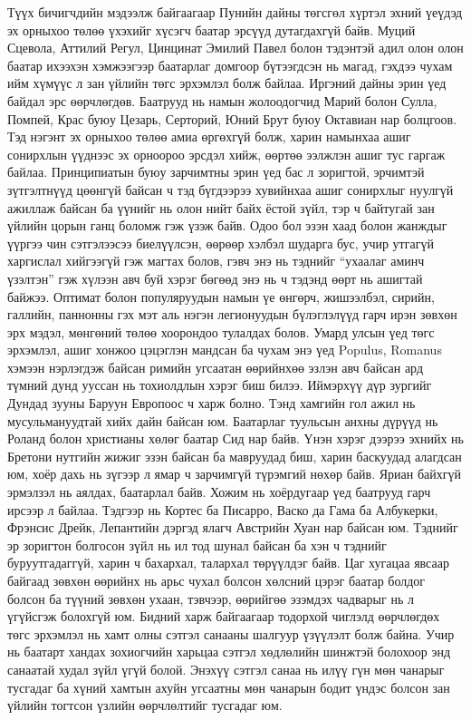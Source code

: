 Түүх бичигчдийн мэдээлж байгаагаар Пунийн дайны төгсгөл хүртэл эхний үеүдэд эх орныхоо төлөө үхэхийг хүсэгч баатар эрсүүд дутагдахгүй байв. Муций Сцевола, Аттилий Регул, Цинцинат Эмилий Павел болон тэдэнтэй адил олон олон баатар ихээхэн хэмжээгээр баатарлаг домгоор бүтээгдсэн нь магад, гэхдээ чухам ийм хүмүүс л зан үйлийн төгс эрхэмлэл болж байлаа. Иргэний дайны эрин үед байдал эрс өөрчлөгдөв. Баатрууд нь намын жолоодогчид Марий болон Сулла, Помпей, Крас буюу Цезарь, Серторий, Юний Брут буюу Октавиан нар болцгоов. Тэд нэгэнт эх орныхоо төлөө амиа өргөхгүй болж, харин намынхаа ашиг сонирхлын үүднээс эх орноороо эрсдэл хийж, өөртөө ээлжлэн ашиг тус гаргаж байлаа. Принципиатын буюу зарчимтны эрин үед бас л зоригтой, эрчимтэй зүтгэлтнүүд цөөнгүй байсан ч тэд бүгдээрээ хувийнхаа ашиг сонирхлыг нуулгүй ажиллаж байсан ба үүнийг нь олон нийт байх ёстой зүйл, тэр ч байтугай зан үйлийн цорын ганц боломж гэж үзэж байв. Одоо бол эзэн хаад болон жанждыг үүргээ чин сэтгэлээсээ биелүүлсэн, өөрөөр хэлбэл шударга бус, учир утгагүй харгислал хийгээгүй гэж магтах болов, гэвч энэ нь тэднийг “ухаалаг аминч үзэлтэн” гэж хүлээн авч буй хэрэг бөгөөд энэ нь ч тэдэнд өөрт нь ашигтай байжээ. Оптимат болон популяруудын намын үе өнгөрч, жишээлбэл, сирийн, галлийн, паннонны гэх мэт аль нэгэн легионуудын бүлэглэлүүд гарч ирэн зөвхөн эрх мэдэл, мөнгөний төлөө хоорондоо тулалдах болов. Умард улсын үед төгс эрхэмлэл, ашиг хонжоо цэцэглэн мандсан ба чухам энэ үед Populus, Romanus хэмээн нэрлэгдэж байсан римийн угсаатан өөрийнхөө эзлэн авч байсан ард түмний дунд ууссан нь тохиолдлын хэрэг биш билээ.
Иймэрхүү дүр зургийг Дундад зууны Баруун Европоос ч харж болно. Тэнд хамгийн гол ажил нь мусульмануудтай хийх дайн байсан юм. Баатарлаг туульсын анхны дүрүүд нь Роланд болон христианы хөлөг баатар Сид нар байв. Үнэн хэрэг дээрээ эхнийх нь Бретони нутгийн жижиг эзэн байсан ба мавруудад биш, харин баскуудад алагдсан юм, хоёр дахь нь зүгээр л ямар ч зарчимгүй түрэмгий нөхөр байв. Яриан байхгүй эрмэлзэл нь аялдах, баатарлал байв. Хожим нь хоёрдугаар үед баатрууд гарч ирсээр л байлаа. Тэдгээр нь Кортес ба Писарро, Васко да Гама ба Албукерки, Фрэнсис Дрейк, Лепантийн дэргэд ялагч Австрийн Хуан нар байсан юм. Тэднийг эр зоригтон болгосон зүйл нь ил тод шунал байсан ба хэн ч тэднийг буруутгадаггүй, харин ч бахархал, талархал төрүүлдэг байв. Цаг хугацаа явсаар байгаад зөвхөн өөрийнх нь арьс чухал болсон хөлсний цэрэг баатар болдог болсон ба түүний зөвхөн ухаан, тэвчээр, өөрийгөө эзэмдэх чадварыг нь л үгүйсгэж болохгүй юм.
Бидний харж байгаагаар тодорхой чиглэлд өөрчлөгдөх төгс эрхэмлэл нь хамт олны сэтгэл санааны шалгуур үзүүлэлт болж байна. Учир нь баатарт хандах зохиогчийн харьцаа сэтгэл хөдлөлийн шинжтэй болохоор энд санаатай худал зүйл үгүй болой. Энэхүү сэтгэл санаа нь илүү гүн мөн чанарыг тусгадаг ба хүний хамтын ахуйн угсаатны мөн чанарын бодит үндэс болсон зан үйлийн тогтсон үзлийн өөрчлөлтийг тусгадаг юм.
